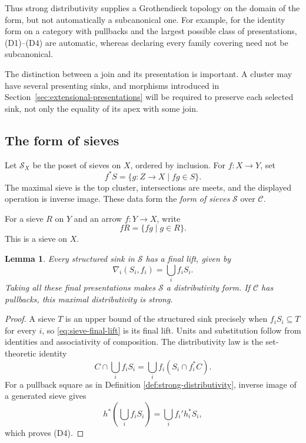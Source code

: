 \documentclass[12pt,oneside,reqno]{amsart}
\newtheorem{lemma}[theorem]{Lemma}
\theoremstyle{definition}
\theoremstyle{remark}
\newcommand{\C}{\mathcal C}
\newcommand{\Sieve}{\mathscr S}
\begin{document}
Thus strong distributivity supplies a Grothendieck topology on the
domain of the form, but not automatically a subcanonical one.  For
example, for the identity form on a category with pullbacks and the
largest possible class of presentations, (D1)--(D4) are automatic,
whereas declaring every family covering need not be subcanonical.

The distinction between a join and its presentation is important.  A
cluster may have several presenting sinks, and morphisms introduced in
Section~\ref{sec:extensional-presentations} will be required to preserve each selected
sink, not only the equality of its apex with some join.

\subsection{The form of sieves}

Let \(\Sieve_X\) be the poset of sieves on \(X\), ordered by inclusion.
For \(f:X\to Y\), set
\[
 f^*S=\{g:Z\to X\mid fg\in S\}.
\]
The maximal sieve is the top cluster, intersections are meets, and the
displayed operation is inverse image.  These data form the
\emph{form of sieves} \(\Sieve\) over \(\C\).

For a sieve \(R\) on \(Y\) and an arrow \(f:Y\to X\), write
\[
                         fR=\{fg\mid g\in R\}.
\]
This is a sieve on \(X\).

\begin{lemma}\label{lem:sieve-distributivity}
Every structured sink in \(\Sieve\) has a final lift, given by
\begin{equation}\label{eq:sieve-final-lift}
                   \nabla_i(S_i,f_i)=\bigcup_i f_iS_i.
\end{equation}
Taking all these final presentations makes \(\Sieve\) a distributivity
form.  If \(\C\) has pullbacks, this maximal distributivity is strong.
\end{lemma}

\begin{proof}
A sieve \(T\) is an upper bound of the structured sink precisely when
\(f_iS_i\subseteq T\) for every \(i\), so
\eqref{eq:sieve-final-lift} is its final lift.  Units and substitution
follow from identities and associativity of composition.  The
distributivity law is the set-theoretic identity
\[
 C\cap\bigcup_i f_iS_i
   =\bigcup_i f_i(S_i\cap f_i^*C).
\]
For a pullback square as in Definition
\ref{def:strong-distributivity}, inverse image of a generated sieve gives
\[
 h^*\!\left(\bigcup_i f_iS_i\right)
   =\bigcup_i f_i'h_i^*S_i,
\]
which proves (D4).
\end{proof}
\end{document}
